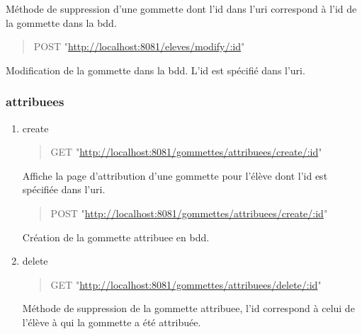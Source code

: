 \documentclass[11pt]{article}
\begin{document}
Méthode de suppression d'une gommette dont l'id dans l'uri correspond
à l'id de la gommette dans la bdd.

\begin{quote}
POST "\url{http://localhost:8081/eleves/modify/:id}"
\end{quote}

Modification de la gommette dans la bdd. L'id est spécifié dans l'uri.

\subsubsection{attribuees}
\label{sec:orgc332927}
\begin{enumerate}
\item create
\label{sec:org30a8c25}

\begin{quote}
GET "\url{http://localhost:8081/gommettes/attribuees/create/:id}"
\end{quote}

Affiche la page d'attribution d'une gommette pour l'élève dont l'id est
spécifiée dans l'uri.

\begin{quote}
POST "\url{http://localhost:8081/gommettes/attribuees/create/:id}"
\end{quote}

Création de la gommette attribuee en bdd.

\item delete
\label{sec:org60946ce}

\begin{quote}
GET "\url{http://localhost:8081/gommettes/attribuees/delete/:id}"
\end{quote}

Méthode de suppression de la gommette attribuee, l'id correspond à celui
de l'élève à qui la gommette a été attribuée.


\noindent
\newpage
\setcounter{tocdepth}{5}
\tableofcontents
\newpage
\listoffigures
\listoftables
\end{enumerate}
\end{document}

